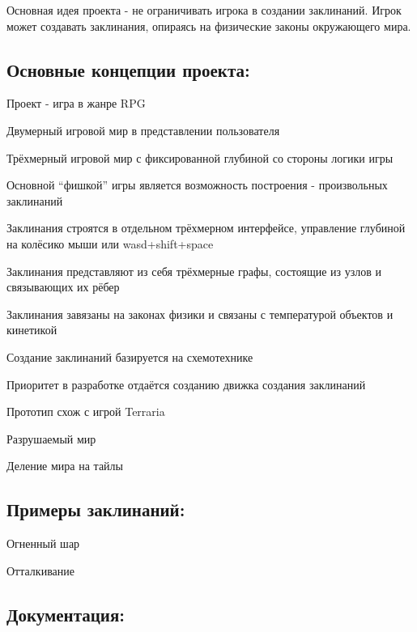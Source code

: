 Основная идея проекта -\/ не ограничивать игрока в создании заклинаний. Игрок может создавать заклинания, опираясь на физические законы окружающего мира.

\subsection*{Основные концепции проекта\-:}


\begin{DoxyItemize}
\item Проект -\/ игра в жанре R\-P\-G
\item Двумерный игровой мир в представлении пользователя
\item Трёхмерный игровой мир с фиксированной глубиной со стороны логики игры
\item Основной “фишкой” игры является возможность построения -\/ произвольных заклинаний
\item Заклинания строятся в отдельном трёхмерном интерфейсе, управление глубиной на колёсико мыши или wasd+shift+space
\item Заклинания представляют из себя трёхмерные графы, состоящие из узлов и связывающих их рёбер
\item Заклинания завязаны на законах физики и связаны с температурой объектов и кинетикой
\item Создание заклинаний базируется на схемотехнике
\item Приоритет в разработке отдаётся созданию движка создания заклинаний
\item Прототип схож с игрой Terraria
\item Разрушаемый мир
\item Деление мира на тайлы
\end{DoxyItemize}

\subsection*{Примеры заклинаний\-:}


\begin{DoxyItemize}
\item Огненный шар
\item Отталкивание
\end{DoxyItemize}

\subsection*{Документация\-:}

